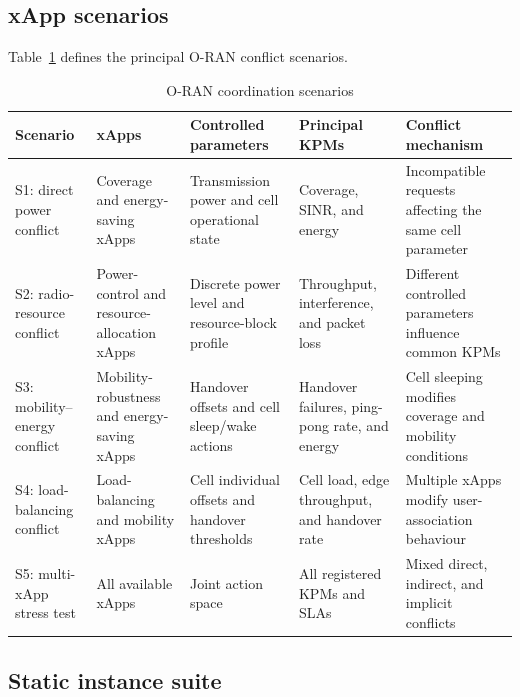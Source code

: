 \documentclass[pdflatex,sn-mathphys-num,iicol,oneside]{sn-jnl}
\begin{document}
\subsection{xApp scenarios}

Table~\ref{tab:scenarios} defines the principal O-RAN conflict
scenarios.

\begin{table}[t]
\centering
\caption{O-RAN coordination scenarios}
\label{tab:scenarios}
\setlength{\tabcolsep}{4pt}\small
\begin{tabular}{
p{19mm}
p{28mm}
p{34mm}
p{34mm}
p{39mm}
}
\toprule
Scenario &
xApps &
Controlled parameters &
Principal KPMs &
Conflict mechanism\\
\midrule

S1: direct power conflict &
Coverage and energy-saving xApps &
Transmission power and cell operational state &
Coverage, SINR, and energy &
Incompatible requests affecting the same cell parameter\\

S2: radio-resource conflict &
Power-control and resource-allocation xApps &
Discrete power level and resource-block profile &
Throughput, interference, and packet loss &
Different controlled parameters influence common KPMs\\

S3: mobility--energy conflict &
Mobility-robustness and energy-saving xApps &
Handover offsets and cell sleep/wake actions &
Handover failures, ping-pong rate, and energy &
Cell sleeping modifies coverage and mobility conditions\\

S4: load-balancing conflict &
Load-balancing and mobility xApps &
Cell individual offsets and handover thresholds &
Cell load, edge throughput, and handover rate &
Multiple xApps modify user-association behaviour\\

S5: multi-xApp stress test &
All available xApps &
Joint action space &
All registered KPMs and SLAs &
Mixed direct, indirect, and implicit conflicts\\

\bottomrule
\end{tabular}
\normalsize
\end{table}

\subsection{Static instance suite}
\end{document}
